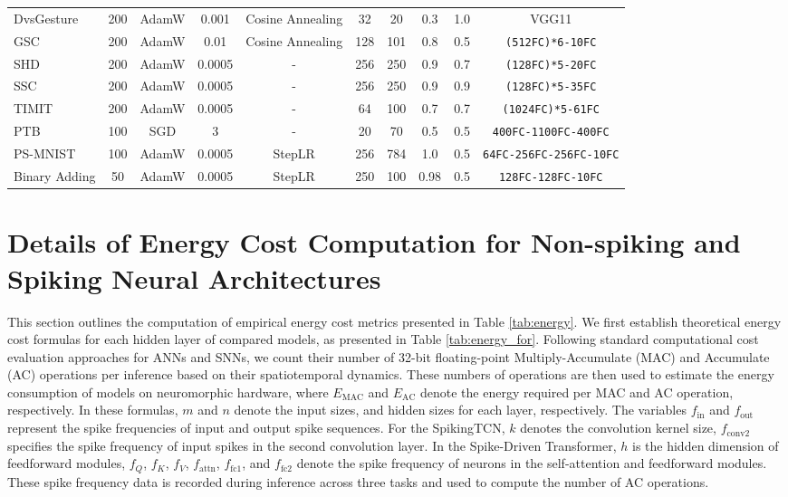 \begin{table}[!t]
{\begin{tabular}{lccccccccc}
DvsGesture        & 200 & AdamW & 0.001 & Cosine Annealing & 32 & 20 & 0.3 & 1.0 & VGG11 \\
GSC       & 200 & AdamW & 0.01 & Cosine Annealing & 128 & 101  & 0.8 & 0.5 &  \texttt{(512FC)*6-10FC}  \\ 
SHD       & 200 & AdamW & 0.0005 & -        & 256 & 250  & 0.9 & 0.7 & \texttt{(128FC)*5-20FC}  \\
SSC       & 200 & AdamW & 0.0005 & -        & 256 & 250  & 0.9 & 0.9 & \texttt{(128FC)*5-35FC}  \\ 
TIMIT     & 200 & AdamW & 0.0005 & -        & 64  & 100  & 0.7 & 0.7 & \texttt{(1024FC)*5-61FC} \\ 
\hline
PTB       & 100 & SGD  & 3     & -          & 20  & 70 & 0.5 & 0.5 & \texttt{400FC-1100FC-400FC} \\
PS-MNIST & 100 & AdamW & 0.0005 & StepLR    & 256 & 784 & 1.0 & 0.5 & \texttt{64FC-256FC-256FC-10FC} \\
Binary Adding & 50 & AdamW & 0.0005 & StepLR & 250 & 100 & 0.98 & 0.5 & \texttt{128FC-128FC-10FC} \\ 
\hline
\end{tabular}%
}
\end{table}

\section{Details of Energy Cost Computation for Non-spiking and Spiking Neural Architectures}
\label{sec:energy_·cost}
This section outlines the computation of empirical energy cost metrics presented in Table \ref{tab:energy}. 
We first establish theoretical energy cost formulas for each hidden layer of compared models, as presented in Table \ref{tab:energy_for}. Following standard computational cost evaluation approaches for ANNs and SNNs, we count their number of 32-bit floating-point Multiply-Accumulate (MAC) and Accumulate (AC) operations per inference based on their spatiotemporal dynamics. These numbers of operations are then used to estimate the energy consumption of models on neuromorphic hardware, where $E_\text{MAC}$ and $E_\text{AC}$ denote the energy required per MAC and AC operation, respectively. In these formulas, $m$ and $n$ denote the input sizes, and hidden sizes for each layer, respectively. The variables $f_\text{in}$ and $f_\text{out}$ represent the spike frequencies of input and output spike sequences. For the SpikingTCN, $k$ denotes the convolution kernel size, $f_\text{conv2}$ specifies the spike frequency of input spikes in the second convolution layer. In the Spike-Driven Transformer, $h$ is the hidden dimension of feedforward modules, $f_{Q}$, $f_{K}$, $f_{V}$, $f_\text{attn}$, $f_\text{fc1}$, and $f_\text{fc2}$ denote the spike frequency of neurons in the self-attention and feedforward modules. These spike frequency data is recorded during inference across three tasks and used to compute the number of AC operations.

